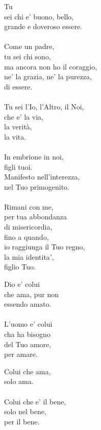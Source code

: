 \begin{haiku}
    Tu\\
    sei chi e' buono, bello,\\
    grande e doveroso essere.\\
    \leavevmode\\
    Come un padre,\\
    tu sei chi sono,\\
    ma ancora non ho il coraggio,\\
    ne' la grazia, ne' la purezza,\\
    di essere.\\
    \leavevmode\\
    Tu sei l'Io, l'Altro, il Noi,\\
    che e' la via,\\
    la verità,\\ 
    la vita.\\
    \leavevmode\\
    In embrione in noi, \\
    figli tuoi.\\
    Manifesto nell'interezza,\\
    nel Tuo primogenito.\\
    \leavevmode\\
    Rimani con me,\\
    per tua abbondanza \\
    di misericordia,\\
    fino a quando,\\
    io raggiunga il Tuo regno,\\
    la mia identita',\\
    figlio Tuo.\\
\end{haiku}

\begin{haiku}
    Dio e' colui\\
che ama, pur non\\
essendo amato.\\
\leavevmode\\
L'uomo e' colui\\
cha ha bisogno\\
del Tuo amore,\\
per amare.\\
\end{haiku}

\begin{haiku}
    Colui che
    ama,\\
    solo ama.\\
    \leavevmode\\
    Colui che e' il bene,\\
    solo nel bene,\\
    per il bene.\\
\end{haiku}

